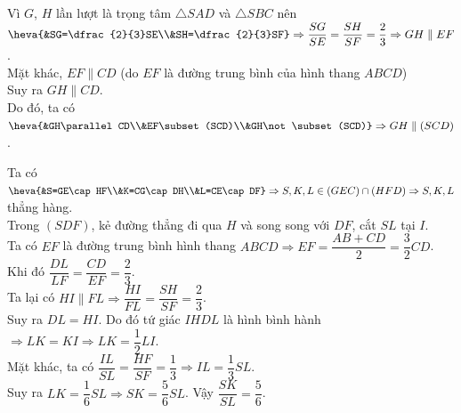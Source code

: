 \begin{bt}
\begin{bt}
{\begin{listEX}[1]
			\item Vì $G$, $H$ lần lượt là trọng tâm $\triangle SAD$ và $\triangle SBC$ nên $\heva{&SG=\dfrac{2}{3}SE\\&SH=\dfrac{2}{3}SF}\Rightarrow \dfrac{SG}{SE}=\dfrac{SH}{SF}=\dfrac{2}{3}\Rightarrow GH\parallel EF$.\\
			Mặt khác, $EF\parallel CD$ (do $EF$ là đường trung bình của hình thang $ABCD$)\\
			Suy ra $GH\parallel CD$.\\
			Do đó, ta có $\heva{&GH\parallel CD\\&EF\subset (SCD)\\&GH\not\subset (SCD)}\Rightarrow GH\parallel (SCD)$.
			\item Ta có $\heva{&S=GE\cap HF\\&K=CG\cap DH\\&L=CE\cap DF}\Rightarrow S,K,L \in (GEC)\cap(HFD)\Rightarrow S,K,L$ thẳng hàng.\\
			Trong $(SDF)$, kẻ đường thẳng đi qua $H$ và song song với $DF$, cắt $SL$ tại $I$.\\
			Ta có $EF$ là đường trung bình hình thang $ABCD\Rightarrow EF=\dfrac{AB+CD}{2}=\dfrac{3}{2}CD$.\\
			Khi đó $\dfrac{DL}{LF}=\dfrac{CD}{EF}=\dfrac{2}{3}$.\\
			Ta lại có $HI\parallel FL\Rightarrow \dfrac{HI}{FL}=\dfrac{SH}{SF}=\dfrac{2}{3}$.\\
			Suy ra $DL=HI$. Do đó tứ giác $IHDL$ là hình bình hành $\Rightarrow LK=KI\Rightarrow LK=\dfrac{1}{2}LI$.\\
			Mặt khác, ta có $\dfrac{IL}{SL}=\dfrac{HF}{SF}=\dfrac{1}{3}\Rightarrow IL=\dfrac{1}{3}SL$.\\
			Suy ra $LK=\dfrac{1}{6}SL\Rightarrow SK=\dfrac{5}{6}SL$. Vậy $\dfrac{SK}{SL}=\dfrac{5}{6}$.
		\end{listEX}	
	}
\end{bt}


\end{bt}
